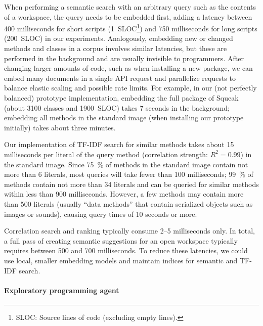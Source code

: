 When performing a semantic search with an arbitrary query such as the contents of a workspace, the query needs to be embedded first, adding a latency between 400 milliseconds for short scripts (\qty{1}{SLOC}\footnote{SLOC: Source lines of code (excluding empty lines).}) and 750 milliseconds for long scripts (\qty{200}{SLOC}) in our experiments.
Analogously, embedding new or changed methods and classes in a corpus involves similar latencies, but these are performed in the background and are usually invisible to programmers.
After changing larger amounts of code, such as when installing a new package, we can embed many documents in a single API request and parallelize requests to balance elastic scaling and possible rate limits.
For example, in our (not perfectly balanced) prototype implementation, embedding the full  package of Squeak (about \num{3100} classes and \qty{1900}{SLOC}) takes 7 seconds in the background; embedding all methods in the standard image (when installing our prototype initially) takes about three minutes.

Our implementation of TF-IDF search for similar methods takes about 15 milliseconds per literal of the query method (correlation strength: $R^2 = 0.99$) in the standard image.
Since \qty{75}{\percent} of methods in the standard image contain not more than 6 literals, most queries will take fewer than 100 milliseconds; \qty{99}{\percent} of methods contain not more than 34 literals and can be queried for similar methods within less than 900 milliseconds.
However, a few methods may contain more than 500 literals (usually ``data methods'' that contain serialized objects such as images or sounds), causing query times of 10 seconds or more.

Correlation search and ranking typically consume 2--5 milliseconds only.
In total, a full pass of creating semantic suggestions for an open workspace typically requires between 500 and 700 milliseconds.
To reduce these latencies, we could use local, smaller embedding models and maintain indices for semantic and TF-IDF search.

\paragraph{Exploratory programming agent}
\label{par:discussion/performance/latencies/agent}

